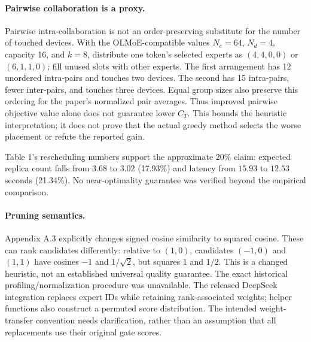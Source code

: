 \documentclass[10pt]{article}
\begin{document}
\paragraph*{Pairwise collaboration is a proxy.}\mbox{}\par
Pairwise intra-collaboration is not an order-preserving substitute for the number of touched devices. With the OLMoE-compatible values \(N_e=64\), \(N_d=4\), capacity 16, and \(k=8\), distribute one token’s selected experts as \((4,4,0,0)\) or \((6,1,1,0)\); fill unused slots with other experts. The first arrangement has 12 unordered intra-pairs and touches two devices. The second has 15 intra-pairs, fewer inter-pairs, and touches three devices. Equal group sizes also preserve this ordering for the paper’s normalized pair averages. Thus improved pairwise objective value alone does not guarantee lower \(C_T\). This bounds the heuristic interpretation; it does not prove that the actual greedy method selects the worse placement or refute the reported gain.\par
Table 1’s rescheduling numbers support the approximate 20\% claim: expected replica count falls from \(3.68\) to \(3.02\) (17.93\%) and latency from \(15.93\) to \(12.53\) seconds (21.34\%). No near-optimality guarantee was verified beyond the empirical comparison.\par
\paragraph*{Pruning semantics.}\mbox{}\par
Appendix A.3 explicitly changes signed cosine similarity to squared cosine. These can rank candidates differently: relative to \((1,0)\), candidates \((-1,0)\) and \((1,1)\) have cosines \(-1\) and \(1/\sqrt2\), but squares \(1\) and \(1/2\). This is a changed heuristic, not an established universal quality guarantee. The exact historical profiling/normalization procedure was unavailable. The released DeepSeek integration replaces expert IDs while retaining rank-associated weights; helper functions also construct a permuted score distribution. The intended weight-transfer convention needs clarification, rather than an assumption that all replacements use their original gate scores.\par
\end{document}
